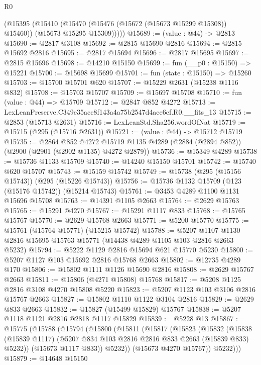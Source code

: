 \begin{lexlean}{R0}
\begin{coremodule}
        (@15395
          (@15410
            (@15470 (@15476 (@15672 (@15673 @15299 @15308)) @15460))
            (@15673 @15295 @15309)))))
@15689 := (value : @44) -> @2813
@15690 := @2817 @3108
@15692 := @2815 @15690 @2816
@15694 := @2815 @15692 @2816
@15695 := @2817 @15694
@15696 := @2817 @15695
@15697 := @2815 @15696
@15698 := @14210 @15150
@15699 := fun (__p0 : @15150) => @15221
@15700 := @15698 @15699
@15701 := fun (state : @15150) => @15260
@15703 := @15700 @15701 @620
@15707 := @15229 @2631 (@15238 @1116 @832)
@15708 := @15703 @15707
@15709 := @15697 @15708
@15710 := fun (value : @44) => @15709
@15712 := @2847 @852 @4272
@15713 := LexLeanPreserve.C349e35acc8f143a4a75b2547d4ace6ef.R0.__fits_13
@15715 := @2853 (@15713 @2631)
@15716 := LexLeanStd.Sha256.wordOfNat
@15719 := @15715 (@295 (@15716 @2631))
@15721 := (value : @44) -> @15712 @15719
@15735 := @2864
    @852
    @4272
    @15719
    @1135
    @4289
    (@2884 (@2894 @852))
    (@2900 (@2901 (@2902 @1135) @4272 @2879))
@15736 := @15349 @4289
@15738 := @15736 @1133 @15709
@15740 := @14240 @15150 @15701
@15742 := @15740 @620 @15707
@15743 := @15159 @15742
@15749 := @15738 (@295 (@15156 @15743)) (@295 (@15226 @15743))
@15756 := @15736 @1132 @15709 (@123 (@15176 @15742)) (@15214 @15743)
@15761 := @3453 @4289 @1100 @1131 @15696 @15708
@15763 := @14391 @1105 @2663
@15764 := @2629 @15763
@15765 := @15291 @4270
@15767 := @15291 @1117 @833
@15768 := @15765 @15767
@15770 := @2629 @15768 @2663
@15771 := @5200 @15770
@15775 := @15761 (@15764 @15771) (@15215 @15742)
@15788 := @5207 @1107 @1130 @2816 @15695 @15763 @15771 (@14438 @4289 @1105 @103 @2816 @2663 @5232)
@15794 := @5222 @1129 @2816 @15694 @621 @15770 @5230
@15800 := @5207 @1127 @103 @15692 @2816 @15768 @2663
@15802 := @12735 @4289 @170
@15806 := @15802 @1111 @1126 @15690 @2816
@15808 := @2629 @15767 @2663
@15811 := @15806 (@4271 @15808) @15768
@15817 := @5208 @1125 @2816 @3108 @4270 @15808 @5220
@15823 := @5207 @1123 @103 @3106 @2816 @15767 @2663
@15827 := @15802 @1110 @1122 @3104 @2816
@15829 := @2629 @833 @2663
@15832 := @15827 (@15499 @15829) @15767
@15838 := @5207 @1118 @1121 @2816 @2818 @1117 @15829
@15839 := @5228 @13
@15867 := @15775
    (@15788
      (@15794
        (@15800
          (@15811
            (@15817
              (@15823
                (@15832
                  (@15838
                    (@15839 @1117)
                    (@5207 @834 @103 @2816 @2816 @833 @2663 (@15839 @833) @5232))
                  (@15673 @1117 @833))
                @5232))
            (@15673 @4270 @15767))
          @5232)))
@15879 := @14648
    @15150

\end{coremodule}
\end{lexlean}
